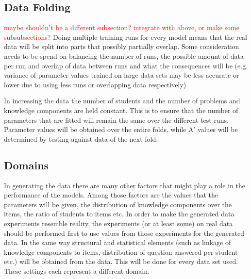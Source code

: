 \documentclass{scrartcl}
\newcommand\todo[1]{\textcolor{red}{#1}}
\begin{document}
\subsection{Data Folding}
\todo{maybe shouldn't be a different subsection? integrate with above, or make some subsubsections?}
Doing multiple training runs for every model means that the real data will be split into parts that possibly partially overlap. Some consideration needs to be spend on balancing the number of runs, the possible amount of data per run and overlap of data between runs and what the consequences will be (e.g. variance of parameter values trained on large data sets may be less accurate or lower due to using less runs or overlapping data respectively)

In increasing the data the number of students and the number of problems and knowledge components are held constant. This is to ensure that the number of parameters that are fitted will remain the same over the different test runs. Parameter values will be obtained over the entire folds, while A' values will be determined by testing against data of the next fold.

\subsection{Domains}
\label{sec:domain}
In generating the data there are many other factors that might play a role in the performance of the models. Among those factors are the values that the parameters will be given, the distribution of knowledge components over the items, the ratio of students to items etc. In order to make the generated data experiments resemble reality, the experiments (or at least some) on real data should be performed first to use values from those experiments for the generated data. In the same way structural and statistical elements (such as linkage of knowledge components to items, distribution of question answered per student etc.) will be obtained from the data. This will be done for every data set used. These settings each represent a different domain.
\end{document}
